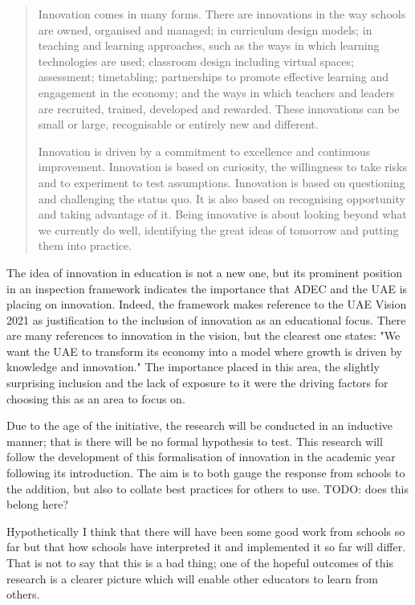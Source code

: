 \begin{quote}
Innovation comes in many forms. There are innovations in the way schools are owned, organised and managed; in curriculum design models; in teaching and learning approaches, such as the ways in which learning technologies are used; classroom design including virtual spaces; assessment; timetabling; partnerships to promote effective learning and engagement in the economy; and the ways in which teachers and leaders are recruited, trained, developed and rewarded. These innovations can be small or large, recognisable or entirely new and different.

Innovation is driven by a commitment to excellence and continuous improvement. Innovation is based on curiosity, the willingness to take risks and to experiment to test assumptions. Innovation is based on questioning and challenging the status quo. It is also based on recognising opportunity and taking advantage of it. Being innovative is about looking beyond what we currently do well, identifying the great ideas of tomorrow and putting them into practice.
\end{quote} \cite[p.12]{ADEC2015}

The idea of innovation in education is not a new one, but its prominent position in an inspection framework indicates the importance that ADEC and the UAE is placing on innovation. Indeed, the framework makes reference to the UAE Vision 2021 as justification to the inclusion of innovation as an educational focus. There are many references to innovation in the vision, but the clearest one states: "We want the UAE to transform its economy into a model where growth is driven by knowledge and innovation." \cite{UAEGovernment2012} The importance placed in this area, the slightly surprising inclusion and the lack of exposure to it were the driving factors for choosing this as an area to focus on.

Due to the age of the initiative, the research will be conducted in an inductive manner; that is there will be no formal hypothesis to test. This research will follow the development of this formalisation of innovation in the academic year following its introduction. The aim is to both gauge the response from schools to the addition, but also to collate best practices for others to use. TODO: does this belong here?

Hypothetically I think that there will have been some good work from schools so far but that how schools have interpreted it and implemented it so far will differ. That is not to say that this is a bad thing; one of the hopeful outcomes of this research is a clearer picture which will enable other educators to learn from others.

